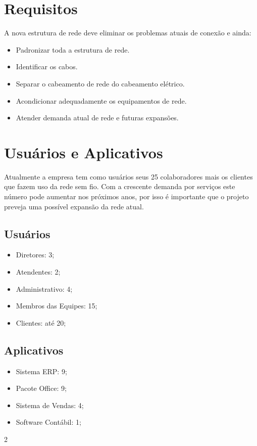 \documentclass[	DIV=calc,%
paper=a4,%
fontsize=12pt,%
onecolumn]{scrartcl}	 					%
\begin{document}
	\section{Requisitos}
	A nova estrutura de rede deve eliminar os problemas atuais de conexão e ainda:
	\begin{itemize}
		\item Padronizar toda a estrutura de rede.
		\item Identificar os cabos.
		\item Separar o cabeamento de rede do cabeamento elétrico.
		\item Acondicionar adequadamente os equipamentos de rede.
		\item Atender demanda atual de rede e futuras expansões.				
	\end{itemize}	
	
	\section{Usuários e Aplicativos}
	Atualmente a empresa tem como usuários seus 25 colaboradores mais os clientes que fazem uso da rede sem fio. Com a crescente demanda por serviços este número pode aumentar nos próximos anos, por isso é importante que o projeto preveja uma possível expansão da rede atual.
	
	\begin{multicols}{2}
	\subsection{Usuários}
	\begin{itemize}
		\item Diretores: 3;
		\item Atendentes: 2;
		\item Administrativo: 4;
		\item Membros das Equipes: 15;
		\item Clientes: até 20;
	\end{itemize}
	\subsection{Aplicativos}
	\begin{itemize}
		\item Sistema ERP: 9;
		\item Pacote Office: 9;
		\item Sistema de Vendas: 4;
		\item Software Contábil: 1;
	\end{itemize}
	\end{multicols}{2}
\end{document}
